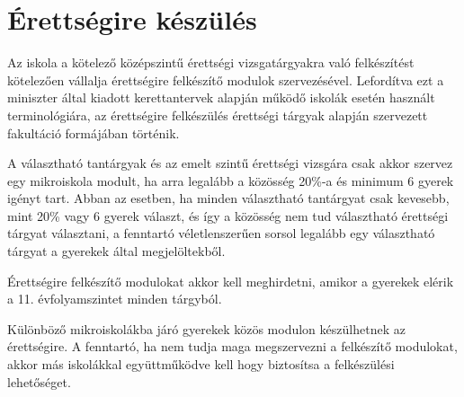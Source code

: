 \section{Érettségire készülés}
\label{sec:erettsegi}

Az iskola a kötelező középszintű érettségi vizsgatárgyakra való
felkészítést kötelezően vállalja érettségire felkészítő modulok
szervezésével. Lefordítva ezt a miniszter által kiadott kerettantervek alapján
működő iskolák esetén használt terminológiára, az érettségire felkészülés
érettségi tárgyak alapján szervezett fakultáció formájában történik.

A választható tantárgyak és az emelt szintű érettségi vizsgára csak akkor
szervez egy mikroiskola modult, ha arra legalább a közösség 20\%-a és minimum 6
gyerek igényt tart. Abban az esetben, ha minden választható tantárgyat csak
kevesebb, 
mint 20\% vagy 6 gyerek választ, és így a közösség nem tud választható érettségi
tárgyat választani, a fenntartó véletlenszerűen sorsol legalább egy választható
tárgyat
a gyerekek által megjelöltekből.

Érettségire felkészítő modulokat akkor kell meghirdetni, amikor a gyerekek
elérik a 11. évfolyamszintet minden tárgyból.

Különböző mikroiskolákba járó gyerekek közös modulon készülhetnek az
érettségire. A fenntartó, ha nem tudja maga megszervezni a felkészítő modulokat, akkor más iskolákkal
együttműködve kell hogy biztosítsa a felkészülési lehetőséget.